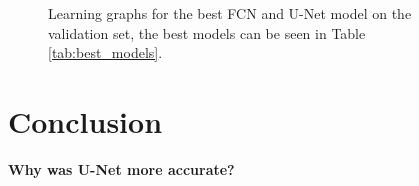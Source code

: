 \documentclass{article}
\begin{document}
\begin{figure}[htbp]
    \vskip 5mm
    \centering
    \qquad
    \caption{Learning graphs for the best FCN and U-Net model on the validation set, the best models can be seen in Table \ref{tab:best_models}.}%
    \label{fig:learninggraphs}%
    \vskip -5mm
\end{figure}

\section{Conclusion}
\label{sec:concl}
\textbf{Why was U-Net more accurate?}
\end{document}
